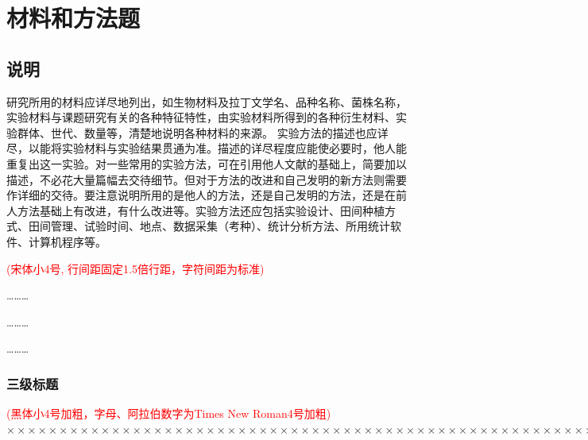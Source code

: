 \documentclass[a4paper]{article}
\newcommand{\kai}{\CJKfamily{kai}}
\newcommand{\wuhao}{\fontsize{10.5pt}{18pt}\selectfont}
\theoremstyle{definition}
\theoremstyle{plain}
\theoremstyle{remark}
\newcommand{\hongzifuzhu}[1]{\textcolor{red}{\kai \wuhao(#1)}}
\begin{document}
\section{材料和方法题}

\subsection{说明}

研究所用的材料应详尽地列出，如生物材料及拉丁文学名、品种名称、菌株名称，实验材料与课题研究有关的各种特征特性，由实验材料所得到的各种衍生材料、实验群体、世代、数量等，清楚地说明各种材料的来源。
实验方法的描述也应详尽，以能将实验材料与实验结果贯通为准。描述的详尽程度应能使必要时，他人能重复出这一实验。对一些常用的实验方法，可在引用他人文献的基础上，简要加以描述，不必花大量篇幅去交待细节。但对于方法的改进和自己发明的新方法则需要作详细的交待。要注意说明所用的是他人的方法，还是自己发明的方法，还是在前人方法基础上有改进，有什么改进等。实验方法还应包括实验设计、田间种植方式、田间管理、试验时间、地点、数据采集（考种）、统计分析方法、所用统计软件、计算机程序等。

\hongzifuzhu{宋体小4号, 行间距固定1.5倍行距，字符间距为标准}

\hspace{15em} \ldots\ldots\ldots

\hspace{15em} \ldots\ldots\ldots

\hspace{15em} \ldots\ldots\ldots

\subsubsection{三级标题}
\hongzifuzhu{黑体小4号加粗，字母、阿拉伯数字为Times New Roman4号加粗}
$ \times\times\times\times\times\times\times\times\times\times\times\times\times\times\times\times\times\times\times\times\times\times\times\times\times\times\times\times\times\times\times\times\times\times\times\times\times\times\times\times\times\times\times\times\times\times\times\times\times\times\times\times\times\times\times\times\times\times\times\times\times\times\times\times\times\times\times\times\times\times\times\times\times\times\times\times\times\times\times\times\times\times\times\times\times\times\times\times\times\times\times\times\times\times\times\times\times\times\times\times $
\end{document}
